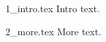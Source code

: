 \begin{filecontents*}{1_intro.tex}
Intro text.
\end{filecontents*}
\begin{filecontents*}{2_more.tex}
More text.
\end{filecontents*}
\documentclass{article}
\usepackage{newclude}


[POST]

